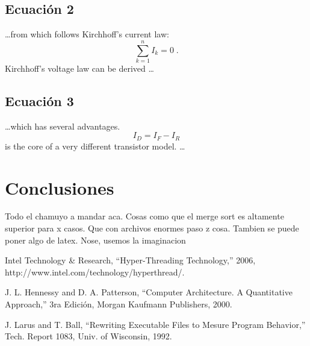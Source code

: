 \subsection{Ecuación 2}
\ldots from which follows Kirchhoff’s current law:
\begin{equation}
\sum_{k=1}^{n} I_k = 0 \; .
\end{equation}
Kirchhoff’s voltage law can be derived \ldots

\subsection{Ecuación 3}
\ldots which has several advantages.
\begin{equation}
I_D = I_F - I_R
\end{equation}
is the core of a very different transistor model. \ldots


\section{Conclusiones}

Todo el chamuyo a mandar aca. Cosas como que el merge sort es altamente superior para x casos. Que con archivos enormes paso z cosa.
Tambien se puede poner algo de latex. Nose, usemos la imaginacion


\begin{thebibliography}{99}

 Intel Technology \& Research, ``Hyper-Threading Technology,'' 2006, http://www.intel.com/technology/hyperthread/.

 J. L. Hennessy and D. A. Patterson, ``Computer Architecture. A Quantitative
Approach,'' 3ra Edición, Morgan Kaufmann Publishers, 2000.

 J. Larus and T. Ball, ``Rewriting Executable Files to Mesure Program Behavior,'' Tech. Report 1083, Univ. of Wisconsin, 1992.

\end{thebibliography}



